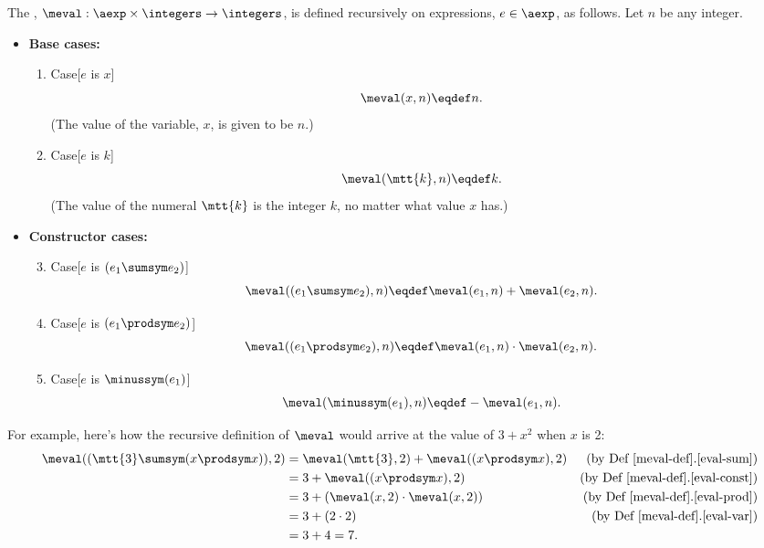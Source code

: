 \begin{definition}
\begin{definition}\label{meval-def}
  The , $\meval: \aexp \times \integers \to
  \integers$, is defined recursively on expressions, $e \in \aexp$, as
  follows.  Let $n$ be any integer.

\begin{itemize}
\item \textbf{Base cases:}

\begin{enumerate}

\item\label{eval-var} Case[$e$ is $x$]
\[
\meval(x, n) \eqdef n.
\]
(The value of the variable, $x$, is given to be $n$.)

\item\label{eval-const} Case[$e$ is $k$]
\[
\meval(\mtt{k}, n) \eqdef k.
\]
(The value of the numeral $\mtt{k}$ is the integer $k$, no matter what
value $x$ has.)

\end{enumerate}

\item \textbf{Constructor cases:}

\begin{enumerate}
\setcounter{enumi}{2}

\item\label{eval-sum} Case[$e$ is $(e_1 \sumsym e_2)$]
\[
\meval((e_1 \sumsym e_2),n) \eqdef
  \meval(e_1,n)+\meval(e_2,n).
\]

\item\label{eval-prod} Case[$e$ is $(e_1 \prodsym e_2)$]
\[
\meval((e_1 \prodsym e_2),n) \eqdef \meval(e_1,n) \cdot \meval(e_2,n).
\]

\item\label{eval-minus} Case[$e$ is $\minussym(e_1)$]
\[
\meval(\minussym(e_1),n) \eqdef - \meval(e_1,n).
\]
\end{enumerate}

\end{itemize}

\end{definition}

For example, here's how the recursive definition of $\meval$ would arrive at
the value of $3+x^2$ when $x$ is 2:
\begin{align*}
\meval((\mtt{3} \sumsym (x \prodsym x)),2)
 & = \meval(\mtt{3},2) + \meval((x \prodsym x),2)
                  & \text{(by~Def~\ref{meval-def}.\ref{eval-sum})}\\
 & = 3 + \meval((x \prodsym x),2) & \text{(by~Def~\ref{meval-def}.\ref{eval-const})}\\
 & = 3 + (\meval(x,2) \cdot \meval(x,2)) & \text{(by~Def~\ref{meval-def}.\ref{eval-prod})}\\
 & = 3 + (2 \cdot 2) & \text{(by~Def~\ref{meval-def}.\ref{eval-var})}\\
 & = 3 + 4 = 7.
\end{align*}


\end{definition}
